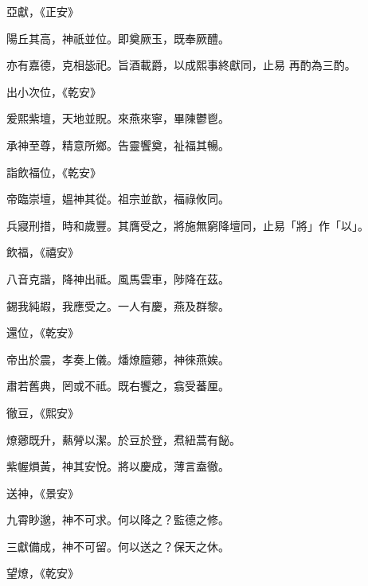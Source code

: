 \begin{pinyinscope}
 亞獻，《正安》



 陽丘其高，神祇並位。即奠厥玉，既奉厥醴。



 亦有嘉德，克相毖祀。旨酒載爵，以成熙事終獻同，止易
 再酌為三酌。



 出小次位，《乾安》



 爰熙紫壇，天地並貺。來燕來寧，畢陳鬱鬯。



 承神至尊，精意所鄉。告靈饗奠，祉福其暢。



 詣飲福位，《乾安》



 帝臨崇壇，媼神其從。祖宗並歆，福祿攸同。



 兵寢刑措，時和歲豐。其膺受之，將施無窮降壇同，止易「將」作「以」。



 飲福，《禧安》



 八音克諧，降神出祗。風馬雲車，陟降在茲。



 錫我純嘏，我應受之。一人有慶，燕及群黎。



 還位，《乾安》



 帝出於震，孝奏上儀。燔燎膻薌，神徠燕娭。



 肅若舊典，罔或不祗。既右饗之，翕受蕃厘。



 徹豆，《熙安》



 燎薌既升，爇膋以潔。於豆於登，焄紐蒿有飶。



 紫幄熉黃，神其安悅。將以慶成，薄言盍徹。



 送神，《景安》



 九霄眇邈，神不可求。何以降之？監德之修。



 三獻備成，神不可留。何以送之？保天之休。



 望燎，《乾安》




\end{pinyinscope}
